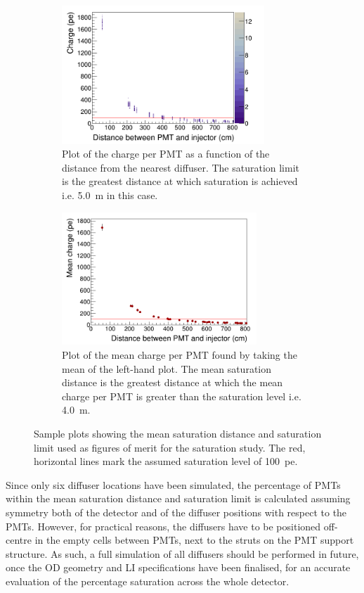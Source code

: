 \documentclass[a4paper,11pt]{article}
\begin{document}
\begin{figure}[h!]
    \centering
    \begin{subfigure}{0.49\textwidth}
         \centering
         \includegraphics[width=\linewidth, height=5.2cm]{charge_distance_reduced_diffuser_41_365.0_nm_10.0_ns_5500000_ppp_all.png}
         \caption{Plot of the charge per PMT as a function of the distance from the nearest diffuser. The saturation limit is the greatest distance at which saturation is achieved i.e. 5.0~m in this case.}
         \label{fig:maxSatDistPlot}
     \end{subfigure}
     \hfill
     \begin{subfigure}{0.49\textwidth}
         \centering
         \includegraphics[width=\linewidth,height=5cm]{mean_charge_distance_reduced_diffuser_41_365.0_nm_10.0_ns_5500000_ppp_all.png}
         \caption{Plot of the mean charge per PMT found by taking the mean of the left-hand plot. The mean saturation distance is the greatest distance at which the mean charge per PMT is greater than the saturation level i.e. 4.0~m.}
         \label{fig:meanSatDistPlot}
     \end{subfigure}
     \caption{Sample plots showing the mean saturation distance and saturation limit used as figures of merit for the saturation study. The red, horizontal lines mark the assumed saturation level of 100~pe.}
     \label{fig:satAnalysisPlots}
\end{figure}

Since only six diffuser locations have been simulated, the percentage of PMTs within the mean saturation distance and saturation limit is calculated assuming symmetry both of the detector and of the diffuser positions with respect to the PMTs. However, for practical reasons, the diffusers have to be positioned off-centre in the empty cells between PMTs, next to the struts on the PMT support structure. As such, a full simulation of all diffusers should be performed in future, once the OD geometry and LI specifications have been finalised, for an accurate evaluation of the percentage saturation across the whole detector.
\end{document}
